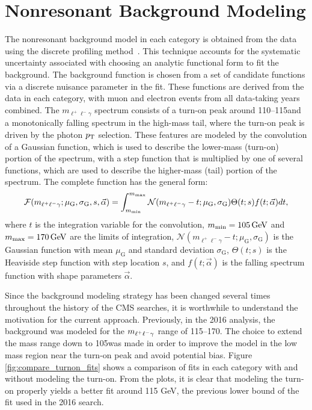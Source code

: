 \section{Nonresonant Background Modeling}
The nonresonant background model in each category is obtained from the data using the discrete profiling method~\cite{Dauncey:2014xga}.
This technique accounts for the systematic uncertainty associated with choosing an analytic functional form to fit the background.
The background function is chosen from a set of candidate functions via a discrete nuisance parameter in the fit.
These functions are derived from the data in each category, with muon and electron events from all data-taking years combined.
The $m_{\ell^+\ell^-\gamma}$ spectrum consists of a turn-on peak around 110--115\GeV and a monotonically falling spectrum in the high-mass tail, where the turn-on peak is driven by the photon $p_{\mathrm{T}}$ selection.
These features are modeled by the convolution of a Gaussian function, which is used to describe the lower-mass (turn-on) portion of the spectrum, with a step function that is multiplied by one of several functions, which are used to describe the higher-mass (tail) portion of the spectrum.
The complete function has the general form:
\begin{equation}
    \mathcal{F}(m_{\ell^{+}\ell^{-}\gamma}; \mu_{\mathrm{G}}, \sigma_{\mathrm{G}}, s, \vec{\alpha}) = \int_{m_\textrm{min}}^{m_\textrm{max}}\mathcal{N}(m_{\ell^{+}\ell^{-}\gamma}-t;\mu_{\mathrm{G}},\sigma_{\mathrm{G}})\Theta(t; s)f(t; \vec{\alpha})dt,
\end{equation}
where $t$ is the integration variable for the convolution, $m_\textrm{min}=105\,\text{Ge\hspace{-.08em}V}$ and $m_\textrm{max}=170\,\text{Ge\hspace{-.08em}V}$ are the limits of integration, $\mathcal{N}(m_{\ell^+\ell^-\gamma}-t;\mu_{\mathrm{G}},\sigma_{\mathrm{G}})$ is the Gaussian function with mean $\mu_{\mathrm{G}}$ and standard deviation $\sigma_{\mathrm{G}}$, $\Theta(t; s)$ is the Heaviside step function with step location $s$, and $f(t; \vec{\alpha})$ is the falling spectrum function with shape parameters $\vec{\alpha}$.

Since the background modeling strategy has been changed several times throughout the history of the CMS \hzg{} searches, 
it is worthwhile to understand the motivation for the current approach. Previously, in the 2016 analysis,
the background was modeled for the $m_{\ell^{+}\ell^{-}\gamma}$ range of 115--170\GeV.
The choice to extend the mass range down to 105\GeV was made in order to improve 
the model in the low mass region near the turn-on peak and avoid potential bias.
Figure \ref{fig:compare_turnon_fits} shows a comparison of fits in each category with and without modeling the turn-on. From the plots, 
it is clear that modeling the turn-on properly yields a better fit around 115 GeV, the previous lower bound of the fit used in the 2016 search. 

